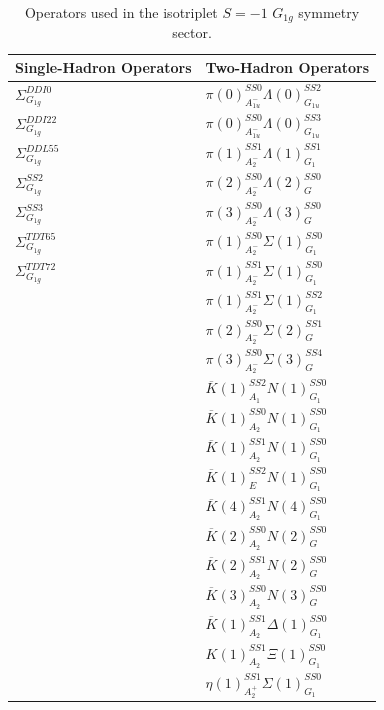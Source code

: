 \begin{table}
    \centering
    \begin{tabular}{l|l}
        \textbf{Single-Hadron Operators} & \textbf{Two-Hadron Operators} \\
        \hline
        $\Sigma_{G_{1g}}^{DDI0}$ & $\pi(0)_{A_{1u}^-}^{SS0}\Lambda(0)_{G_{1u}}^{SS2}$\\
        $\Sigma_{G_{1g}}^{DDI22}$ & $\pi(0)_{A_{1u}^-}^{SS0}\Lambda(0)_{G_{1u}}^{SS3}$\\
        $\Sigma_{G_{1g}}^{DDL55}$ & $\pi(1)_{A_2^-}^{SS1}\Lambda(1)_{G_1}^{SS1}$\\
        $\Sigma_{G_{1g}}^{SS2}$ & $\pi(2)_{A_2^-}^{SS0}\Lambda(2)_{G}^{SS0}$\\
        $\Sigma_{G_{1g}}^{SS3}$ & $\pi(3)_{A_2^-}^{SS0}\Lambda(3)_{G}^{SS0}$\\
        $\Sigma_{G_{1g}}^{TDT65}$ & $\pi(1)_{A_2^-}^{SS0}\Sigma(1)_{G_1}^{SS0}$\\
        $\Sigma_{G_{1g}}^{TDT72}$ & $\pi(1)_{A_2^-}^{SS1}\Sigma(1)_{G_1}^{SS0}$\\
        & $\pi(1)_{A_2^-}^{SS1}\Sigma(1)_{G_1}^{SS2}$\\
        & $\pi(2)_{A_2^-}^{SS0}\Sigma(2)_{G}^{SS1}$\\
        & $\pi(3)_{A_2^-}^{SS0}\Sigma(3)_{G}^{SS4}$\\
        & $\overline K(1)_{A_1}^{SS2}N(1)_{G_1}^{SS0}$\\
        & $\overline K(1)_{A_2}^{SS0}N(1)_{G_1}^{SS0}$\\
        & $\overline K(1)_{A_2}^{SS1}N(1)_{G_1}^{SS0}$\\
        & $\overline K(1)_{E}^{SS2}N(1)_{G_1}^{SS0}$\\
        & $\overline K(4)_{A_2}^{SS1}N(4)_{G_1}^{SS0}$\\
        & $\overline K(2)_{A_2}^{SS0}N(2)_{G}^{SS0}$\\
        & $\overline K(2)_{A_2}^{SS1}N(2)_{G}^{SS0}$\\
        & $\overline K(3)_{A_2}^{SS0}N(3)_{G}^{SS0}$\\
        & $\overline K(1)_{A_2}^{SS1}\Delta(1)_{G_1}^{SS0}$\\
        & $K(1)_{A_2}^{SS1}\Xi(1)_{G_1}^{SS0}$\\
        & $\eta(1)_{A_2^+}^{SS1}\Sigma(1)_{G_1}^{SS0}$
    \end{tabular}
    \caption{Operators used in the isotriplet $S=-1$ $G_{1g}$ symmetry sector.}\label{table:g1g_ops}
\end{table}
